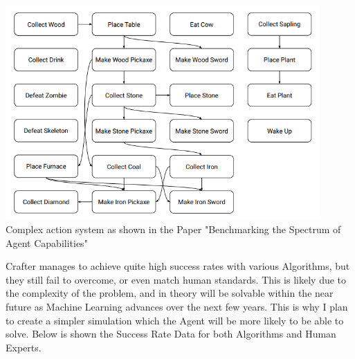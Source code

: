 \begin{flushleft}
                            \vspace{0.2cm}
                            \begin{center}
                                \includegraphics[width=12cm]{Images/InitialResearch/CrafterComplexActionSystem.PNG} \\
                                Complex action system as shown in the Paper "Benchmarking the Spectrum of Agent Capabilities" \\
                            \end{center}
                            \vspace{0.2cm}

                            Crafter manages to achieve quite high success rates with various Algorithms, but they still fail to overcome, or even match
                            human standards. This is likely due to the complexity of the problem, and in theory will be solvable within the near future
                            as Machine Learning advances over the next few years. This is why I plan to create a simpler simulation which the Agent will
                            be more likely to be able to solve. Below is shown the Success Rate Data for both Algorithms and Human Experts. \\


\end{flushleft}
